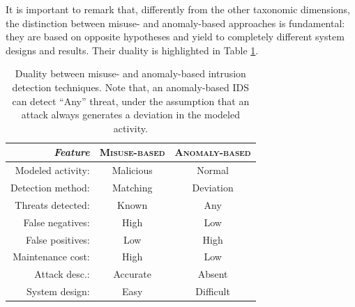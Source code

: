 It is important to remark that, differently from the other taxonomic
dimensions, the distinction between misuse- and anomaly-based
approaches is fundamental: they are based on opposite hypotheses and
yield to completely different system designs and results. Their
duality is highlighted in Table \ref{tab:misuse-vs-anomaly}.

\begin{table}[t]
  \centering
  \begin{tabular}{rcc}
    \toprule \emph{Feature} & \textsc{Misuse-based} &
    \textsc{Anomaly-based}\\
    
    \midrule Modeled activity: & Malicious &
    Normal\\
    
    Detection method: & Matching & Deviation\\

    Threats
    detected: & Known & Any\\

    False negatives: & High & Low\\

    False
    positives: & Low & High\\

    Maintenance cost: & High & Low\\ Attack
    desc.: & Accurate & Absent\\

    System design: & Easy & Difficult\\
    \bottomrule
  \end{tabular}
  \caption{Duality between misuse- and anomaly-based intrusion
    detection techniques. Note that, an anomaly-based \ac{IDS} can
    detect ``Any'' threat, under the assumption that an attack always
    generates a deviation in the modeled activity.}
  \label{tab:misuse-vs-anomaly}
\end{table}

